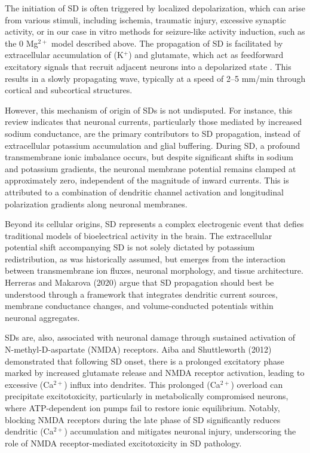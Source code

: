 \documentclass{article}
\begin{document}
The initiation of SD is often triggered by localized depolarization, which can arise from various stimuli, including ischemia, traumatic injury, excessive synaptic activity, or in our case in vitro methods for seizure-like activity induction, such as the 0 \texorpdfstring{Mg$^{2+}$}{Mg2+} model \cite{lu2021} described above. The propagation of SD is facilitated by extracellular accumulation of (K$^+$) and glutamate, which act as feedforward excitatory signals that recruit adjacent neurons into a depolarized state \cite{aiba2012}. This results in a slowly propagating wave, typically at a speed of 2–5 mm/min through cortical and subcortical structures.

However, this mechanism of origin of SDs is not undisputed. For instance, this review \cite{herreras2020} indicates that neuronal currents, particularly those mediated by increased sodium conductance, are the primary contributors to SD propagation, instead of extracellular potassium accumulation and glial buffering. During SD, a profound transmembrane ionic imbalance occurs, but despite significant shifts in sodium and potassium gradients, the neuronal membrane potential remains clamped at approximately zero, independent of the magnitude of inward currents. This is attributed to a combination of dendritic channel activation and longitudinal polarization gradients along neuronal membranes.

Beyond its cellular origins, SD represents a complex electrogenic event that defies traditional models of bioelectrical activity in the brain. The extracellular potential shift accompanying SD is not solely dictated by potassium redistribution, as was historically assumed, but emerges from the interaction between transmembrane ion fluxes, neuronal morphology, and tissue architecture. Herreras and Makarova (2020) \cite{herreras2020} argue that SD propagation should best be understood through a framework that integrates dendritic current sources, membrane conductance changes, and volume-conducted potentials within neuronal aggregates.

SDs are, also, associated with neuronal damage through sustained activation of N-methyl-D-as\-par\-tate (NMDA) receptors. Aiba and Shuttleworth (2012) \cite{aiba2012} demonstrated that following SD onset, there is a prolonged excitatory phase marked by increased glutamate release and NMDA receptor activation, leading to excessive (Ca$^{2+}$) influx into dendrites. This prolonged (Ca$^{2+}$) overload can precipitate excitotoxicity, particularly in metabolically compromised neurons, where ATP-dependent ion pumps fail to restore ionic equilibrium. Notably, blocking NMDA receptors during the late phase of SD significantly reduces dendritic (Ca$^{2+}$) accumulation and mitigates neuronal injury, underscoring the role of NMDA receptor-mediated excitotoxicity in SD pathology.
\end{document}
